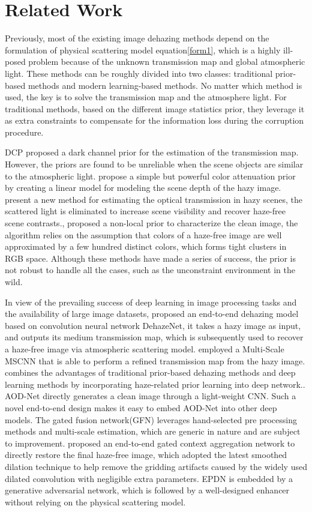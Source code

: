 \documentclass[letterpaper]{article} \usepackage{aaai20}  \usepackage{times}  \usepackage{helvet} \usepackage{courier}  \usepackage[hyphens]{url}  \usepackage{graphicx} \urlstyle{rm} \def\UrlFont{\rm}  \usepackage{graphicx}  \frenchspacing  \setlength{\pdfpagewidth}{8.5in}  \setlength{\pdfpageheight}{11in}  \usepackage{bm}
\begin{document}
\section{Related Work}
Previously, most of the existing image dehazing methods depend on the formulation of physical scattering model equation\ref{form1}, which is a highly ill-posed problem because of the unknown transmission map and global atmospheric light. These methods can be roughly divided into two classes: traditional prior-based  methods and  modern learning-based methods. No matter which method is used, the key is to solve the transmission map and the atmosphere light.
For traditional methods, based on the different image statistics prior, they leverage it as extra constraints to compensate for the information loss during the corruption procedure. 

DCP\cite{featureforward11} proposed a dark channel prior for the estimation of the transmission map. However, the priors are found to be unreliable when the scene objects are similar to the atmospheric light. \cite{featureforward34} propose a simple but powerful color attenuation prior by creating a linear model for modeling the scene depth of the hazy image. \cite{gca11} present a new method for estimating the optical transmission in hazy scenes, the scattered light is eliminated to increase scene visibility and recover haze-free scene contrasts., \cite{featureforward6} proposed a non-local prior to characterize the clean image, the algorithm relies on the assumption that colors of a haze-free image are well approximated by a few hundred distinct colors, which forms tight clusters in RGB space.  Although these methods have made a series of success, the prior is not robust to handle all the cases, such as the unconstraint environment in the wild.

In view of the prevailing success of deep learning in image processing tasks and the availability of large image datasets,  \cite{dehazenet} proposed an end-to-end dehazing model based on convolution neural network DehazeNet, it takes
a hazy image as input, and outputs its medium transmission map, which is subsequently used to recover a haze-free image via atmospheric scattering model. \cite{mscnn}  employed a Multi-Scale MSCNN that is able to perform a  refined transmission map from the hazy image. \cite{proximal}  combines the advantages of traditional prior-based dehazing methods and deep learning methods by incorporating haze-related prior learning into deep network.. \cite{li2017aod}  AOD-Net directly
generates a clean image through a light-weight CNN. Such a novel end-to-end design makes it easy to embed AOD-Net into other deep models.
The gated fusion network(GFN) \cite{gfn}   leverages hand-selected  pre
processing methods and multi-scale estimation, which are generic in nature and are subject to improvement.
\cite{gca}  proposed an end-to-end gated context aggregation network to directly  restore the final haze-free image, which adopted the latest smoothed dilation technique to help remove the gridding artifacts caused by the widely used dilated convolution with negligible extra parameters. EPDN \cite{epdn} is embedded by a generative adversarial network, which is followed by a well-designed enhancer without relying on the physical scattering model.
\end{document}
